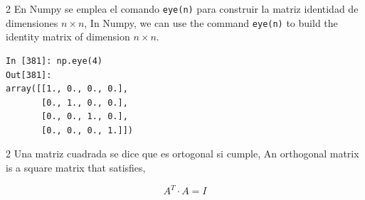\begin{paracol}{2}
En Numpy se emplea el comando \texttt{eye(n)} para construir la matriz identidad de dimensiones $n\times n$,
\switchcolumn
In Numpy, we can use the command \texttt{eye(n)} to build the identity matrix of dimension $n\times n$.   
\end{paracol}

\begin{center}
    \begin{minipage}{0.3\textwidth}
        \begin{verbatim}
In [381]: np.eye(4)
Out[381]: 
array([[1., 0., 0., 0.],
       [0., 1., 0., 0.],
       [0., 0., 1., 0.],
       [0., 0., 0., 1.]])
        \end{verbatim}
    \end{minipage}
\end{center}
\begin{paracol}{2}
Una matriz cuadrada se dice que es ortogonal si cumple,
\switchcolumn
An orthogonal matrix is a square matrix that satisfies,   
\end{paracol}
\begin{equation*}
A^T\cdot A=I
\end{equation*}

